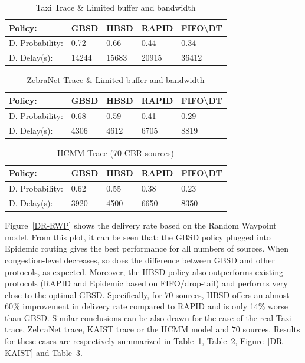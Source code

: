 \begin{table}[!h]
\renewcommand{\arraystretch}{1.1}
\caption{Taxi Trace \& Limited buffer and bandwidth}
\centering
\footnotesize
\begin{tabular}{|p{2.5cm}||p{0.9cm}||p{0.9cm}||p{0.9cm}||p{1.5cm}|}
\hline
\bfseries Policy: & GBSD & HBSD & RAPID & FIFO\textbackslash DT\\
\hline\hline
D. Probability:&0.72 &0.66 &0.44 &0.34\\
\hline\hline
D. Delay(s):&14244&15683&20915&36412\\
\hline
\end{tabular}
\label{T-LB+LB}
\end{table}

\begin{table}[!h]
\renewcommand{\arraystretch}{1.1}
\caption{ZebraNet Trace \& Limited buffer and bandwidth}
\centering
\footnotesize
\begin{tabular}{|p{2.5cm}||p{0.9cm}||p{0.9cm}||p{0.9cm}||p{1.5cm}|}
\hline
\bfseries Policy: & GBSD & HBSD & RAPID & FIFO\textbackslash DT\\
\hline\hline
D. Probability:&0.68&0.59&0.41&0.29\\
\hline\hline
D. Delay(s):&4306&4612&6705&8819\\
\hline
\end{tabular}
\label{ZebraNetResults}
\end{table}


\begin{table}[!h]
\renewcommand{\arraystretch}{1.1}
\caption{HCMM Trace (70 CBR sources)}
\centering
\footnotesize
\begin{tabular}{|p{1.8cm}|p{0.9cm}|p{0.9cm}|p{0.9cm}|p{1.5cm}|}
\hline
\bfseries Policy: & GBSD & HBSD & RAPID & FIFO\textbackslash DT\\
\hline
D. Probability:&0.62&0.55&0.38&0.23\\
\hline
D. Delay(s):&3920&4500&6650&8350\\
\hline
\end{tabular}
\label{HCMM-Results}
\end{table}

Figure~\ref{DR-RWP} shows the delivery rate based on the Random Waypoint model. From this plot, it can be seen that: the GBSD policy plugged into
Epidemic routing gives the best performance for all numbers of
sources. When congestion-level decreases, so does the difference
between GBSD and other protocols, as expected. Moreover, the HBSD
policy also outperforms existing protocols (RAPID and Epidemic based on FIFO/drop-tail) and performs very close to the optimal GBSD. Specifically, for $70$ sources, HBSD offers an almost 60\% improvement in delivery rate compared to RAPID and is only 14\% worse than GBSD. Similar conclusions can be also drawn for the case of the real Taxi trace,  ZebraNet trace, KAIST trace or the HCMM model and $70$ sources. Results for these cases are respectively summarized in Table~\ref{T-LB+LB}, Table~\ref{ZebraNetResults}, Figure~\ref{DR-KAIST} and Table~\ref{HCMM-Results}.

